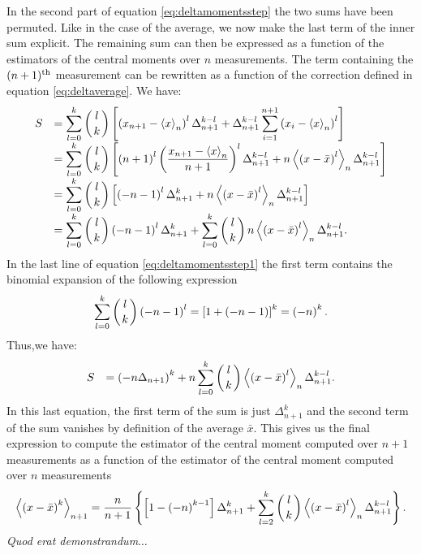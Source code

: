 \documentclass[twoside]{book}
\begin{document}
In the second part of equation \ref{eq:deltamomentsstep} the two
sums have been permuted. Like in the case of the average, we now
make the last term of the inner sum explicit. The remaining sum
can then be expressed as a function of the estimators of the
central moments over $n$ measurements. The term containing the
$(n+1)^{\mathop{\rm th}}$ measurement can be rewritten as a function of the
correction defined in equation \ref{eq:deltaverage}. We have:
\begin{equation}
\label{eq:deltamomentsstep1}
  \begin{array}{ll}
 S&=\displaystyle\sum_{l=0}^k \left({l\atop
   k}\right)\left[\left(x_{n+1}-\left\langle
   x\right\rangle_n\right)^l \Delta_{n+1}^{k-l}+
   \Delta_{n+1}^{k-l}\sum_{i=1}^{n+1} \left(x_i-\left\langle x\right\rangle_n\right)^l
   \right]\\
   &=\displaystyle\sum_{l=0}^k \left({l\atop
   k}\right)\left[\left(n+1\right)^l\left({x_{n+1}-\left\langle
   x\right\rangle_n\over n+1}\right)^l \Delta_{n+1}^{k-l}+
   n\left\langle \left(x-\bar{x}\right)^l\right\rangle_n\Delta_{n+1}^{k-l}
   \right]\\
   &=\displaystyle\sum_{l=0}^k \left({l\atop
   k}\right)\left[\left(-n-1\right)^l \Delta_{n+1}^k+
   n\left\langle \left(x-\bar{x}\right)^l\right\rangle_n\Delta_{n+1}^{k-l}
   \right]\\
   &=\displaystyle\sum_{l=0}^k \left({l\atop
   k}\right)\left(-n-1\right)^l \Delta_{n+1}^k+\sum_{l=0}^k \left({l\atop
   k}\right)
   n\left\langle \left(x-\bar{x}\right)^l\right\rangle_n\Delta_{n+1}^{k-l}
   .\\
  \end{array}
\end{equation}
In the last line of equation \ref{eq:deltamomentsstep1} the first
term contains the binomial expansion of the following expression
\begin{equation}
  \sum_{l=0}^k \left({l\atop k}\right)\left(-n-1\right)^l
  = \left[1+\left(-n-1\right)\right]^k=\left(-n\right)^k.
\end{equation}
Thus,we have:
\begin{equation}
  \begin{array}{ll}
 S&=\displaystyle\left(-n\Delta_{n+1}\right)^k+n\sum_{l=0}^k \left({l\atop
   k}\right)\left\langle \left(x-\bar{x}\right)^l\right\rangle_n\Delta_{n+1}^{k-l}
   .\\
  \end{array}
\end{equation}
In this last equation, the first term of the sum is just
$\Delta_{n+1}^k$ and the second term of the sum vanishes by
definition of the average $\bar{x}$. This gives us the final
expression to compute the estimator of the central moment computed
over $n+1$ measurements as a function of the estimator of the
central moment computed over $n$ measurements
\begin{equation}
  \left\langle\left(x-\bar{x}\right)^k\right\rangle_{n+1}
  ={n\over n+1}\left\{
  \left[ 1 - \left(-n\right)^{k-1}\right]\Delta_{n+1}^k
  +\sum_{l=2}^k \left({l\atop k}\right)
  \left\langle\left(x-\bar{x}\right)^l\right\rangle_n
  \Delta_{n+1}^{k-l}
  \right\}.
\end{equation}
{\sl Quod erat demonstrandum$\ldots$}
\end{document}
